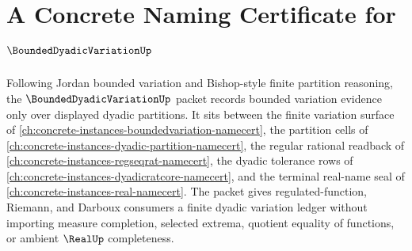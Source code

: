 \chapter{A Concrete Naming Certificate for $\BoundedDyadicVariationUp$}
\label{ch:concrete-instances-bounded-dyadic-variation-namecert}

Following Jordan bounded variation and Bishop-style finite partition reasoning, the $\BoundedDyadicVariationUp$ packet records bounded variation evidence only over displayed dyadic partitions. It sits between the finite variation surface of \autoref{ch:concrete-instances-boundedvariation-namecert}, the partition cells of \autoref{ch:concrete-instances-dyadic-partition-namecert}, the regular rational readback of \autoref{ch:concrete-instances-regseqrat-namecert}, the dyadic tolerance rows of \autoref{ch:concrete-instances-dyadicratcore-namecert}, and the terminal real-name seal of \autoref{ch:concrete-instances-real-namecert}. The packet gives regulated-function, Riemann, and Darboux consumers a finite dyadic variation ledger without importing measure completion, selected extrema, quotient equality of functions, or ambient $\RealUp$ completeness.

